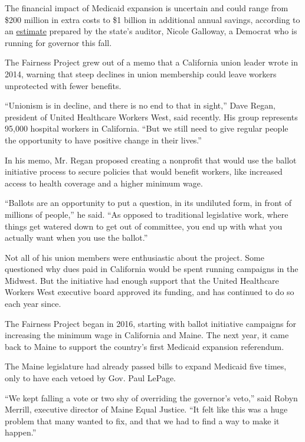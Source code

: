 The financial impact of Medicaid expansion is uncertain and could range
from \$200 million in extra costs to \$1 billion in additional annual
savings, according to an
\href{https://www.stltoday.com/news/local/state-and-regional/petition-seeks-to-put-medicaid-expansion-on-missouri-ballot/article_5cd960fe-be37-59a4-8391-f907f5f19352.html}{estimate}
prepared by the state's auditor, Nicole Galloway, a Democrat who is
running for governor this fall.

The Fairness Project grew out of a memo that a California union leader
wrote in 2014, warning that steep declines in union membership could
leave workers unprotected with fewer benefits.

``Unionism is in decline, and there is no end to that in sight,'' Dave
Regan, president of United Healthcare Workers West, said recently. His
group represents 95,000 hospital workers in California. ``But we still
need to give regular people the opportunity to have positive change in
their lives.''

In his memo, Mr. Regan proposed creating a nonprofit that would use the
ballot initiative process to secure policies that would benefit workers,
like increased access to health coverage and a higher minimum wage.

``Ballots are an opportunity to put a question, in its undiluted form,
in front of millions of people,'' he said. ``As opposed to traditional
legislative work, where things get watered down to get out of committee,
you end up with what you actually want when you use the ballot.''

Not all of his union members were enthusiastic about the project. Some
questioned why dues paid in California would be spent running campaigns
in the Midwest. But the initiative had enough support that the United
Healthcare Workers West executive board approved its funding, and has
continued to do so each year since.

The Fairness Project began in 2016, starting with ballot initiative
campaigns for increasing the minimum wage in California and Maine. The
next year, it came back to Maine to support the country's first Medicaid
expansion referendum.

The Maine legislature had already passed bills to expand Medicaid five
times, only to have each vetoed by Gov. Paul LePage.

``We kept falling a vote or two shy of overriding the governor's veto,''
said Robyn Merrill, executive director of Maine Equal Justice. ``It felt
like this was a huge problem that many wanted to fix, and that we had to
find a way to make it happen.''

